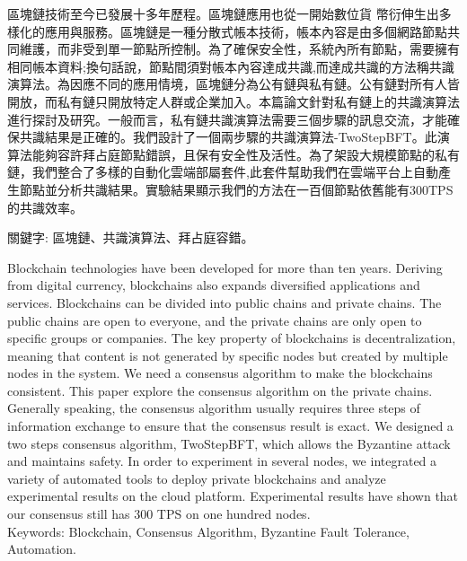 \begin{abstractzh}
區塊鏈技術至今已發展十多年歷程。區塊鏈應用也從一開始數位貨  幣衍伸生出多樣化的應用與服務。區塊鏈是一種分散式帳本技術，帳本內容是由多個網路節點共同維護，而非受到單一節點所控制。為了確保安全性，系統內所有節點，需要擁有相同帳本資料;換句話說，節點間須對帳本內容達成共識,而達成共識的方法稱共識演算法。為因應不同的應用情境，區塊鏈分為公有鏈與私有鏈。公有鏈對所有人皆開放，而私有鏈只開放特定人群或企業加入。本篇論文針對私有鏈上的共識演算法進行探討及研究。一般而言，私有鏈共識演算法需要三個步驟的訊息交流，才能確保共識結果是正確的。我們設計了一個兩步驟的共識演算法-TwoStep­BFT。此演算法能夠容許拜占庭節點錯誤，且保有安全性及活性。為了架設大規模節點的私有鏈，我們整合了多樣的自動化雲端部屬套件,此套件幫助我們在雲端平台上自動產生節點並分析共識結果。實驗結果顯示我們的方法在一百個節點依舊能有300TPS的共識效率。

\noindent
關鍵字: 區塊鏈、共識演算法、拜占庭容錯。 
\end{abstractzh}

\begin{abstracten}
Blockchain technologies have been developed for more than ten years. Deriving from digital currency, blockchains also expands diversified applications and services. Blockchains can be divided into public chains and private chains. The public chains are open to everyone, and the private chains are only open to specific groups or companies. The key property of blockchains is decentralization, meaning that content is not generated by specific nodes but created by multiple nodes in the system. We need a consensus algorithm to make the blockchains consistent. This paper explore the consensus algorithm on the private chains. Generally speaking, the consensus algorithm usually requires three steps of information exchange to ensure that the consensus result is exact. We designed a two steps consensus algorithm, TwoStepBFT, which allows the Byzantine attack and maintains safety. In order to experiment in several nodes, we integrated a variety of automated tools to deploy private blockchains and analyze experimental results on the cloud platform. Experimental results have shown that our consensus still has 300 TPS on one hundred nodes. \\
	
\noindent
Keywords: Blockchain, Consensus Algorithm, Byzantine Fault Tolerance, Automation. 
\end{abstracten}
